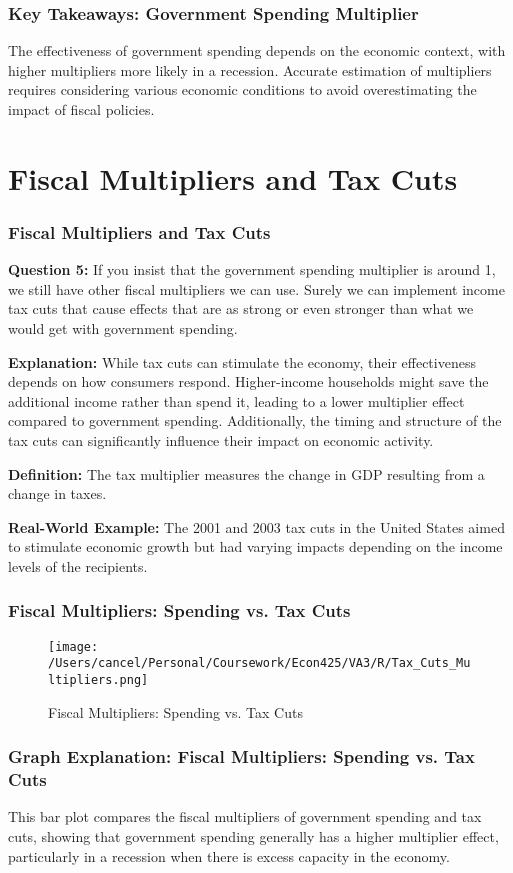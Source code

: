 \documentclass{beamer}
\begin{document}
\begin{frame}
    \frametitle{Key Takeaways: Government Spending Multiplier}
    The effectiveness of government spending depends on the economic context, with higher multipliers more likely in a recession. Accurate estimation of multipliers requires considering various economic conditions to avoid overestimating the impact of fiscal policies.
\end{frame}

\section{Fiscal Multipliers and Tax Cuts}
\begin{frame}
    \frametitle{Fiscal Multipliers and Tax Cuts}
    \textbf{Question 5:} If you insist that the government spending multiplier is around 1, we still have other fiscal multipliers we can use. Surely we can implement income tax cuts that cause effects that are as strong or even stronger than what we would get with government spending.

    \textbf{Explanation:} While tax cuts can stimulate the economy, their effectiveness depends on how consumers respond. Higher-income households might save the additional income rather than spend it, leading to a lower multiplier effect compared to government spending. Additionally, the timing and structure of the tax cuts can significantly influence their impact on economic activity.

    \textbf{Definition:} The tax multiplier measures the change in GDP resulting from a change in taxes.

    \textbf{Real-World Example:} The 2001 and 2003 tax cuts in the United States aimed to stimulate economic growth but had varying impacts depending on the income levels of the recipients.
\end{frame}

\begin{frame}
    \frametitle{Fiscal Multipliers: Spending vs. Tax Cuts}
    \begin{figure}[h!]
        \centering
        \texttt{[image: /Users/cancel/Personal/Coursework/Econ425/VA3/R/Tax\_Cuts\_Multipliers.png]}
        \caption{Fiscal Multipliers: Spending vs. Tax Cuts}
    \end{figure}
\end{frame}

\begin{frame}
    \frametitle{Graph Explanation: Fiscal Multipliers: Spending vs. Tax Cuts}
    This bar plot compares the fiscal multipliers of government spending and tax cuts, showing that government spending generally has a higher multiplier effect, particularly in a recession when there is excess capacity in the economy.
\end{frame}
\end{document}
